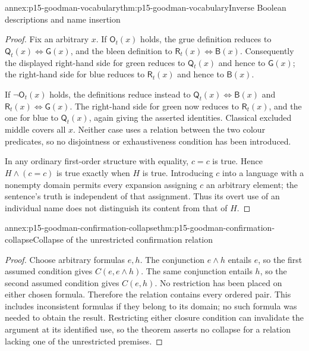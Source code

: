 \begin{annexitem}{annex:p15-goodman-vocabulary}{thm:p15-goodman-vocabulary}{Inverse Boolean descriptions and name insertion}
\begin{proof}
Fix an arbitrary $x$. If $\mathsf{O}_t(x)$ holds, the grue definition
reduces to $\mathsf{Q}_t(x)\Longleftrightarrow\mathsf{G}(x)$,
and the bleen definition to
$\mathsf{R}_t(x)\Longleftrightarrow\mathsf{B}(x)$.
Consequently the displayed right-hand side for green reduces to
$\mathsf{Q}_t(x)$ and hence to $\mathsf{G}(x)$; the right-hand
side for blue reduces to $\mathsf{R}_t(x)$ and hence to
$\mathsf{B}(x)$.

If $\neg\mathsf{O}_t(x)$ holds, the definitions reduce instead to
$\mathsf{Q}_t(x)\Longleftrightarrow\mathsf{B}(x)$ and
$\mathsf{R}_t(x)\Longleftrightarrow\mathsf{G}(x)$.
The right-hand side for green now reduces to $\mathsf{R}_t(x)$,
and the one for blue to $\mathsf{Q}_t(x)$, again giving the asserted
identities. Classical excluded middle covers all $x$. Neither case
uses a relation between the two colour predicates, so no disjointness
or exhaustiveness condition has been introduced.

In any ordinary first-order structure with equality, $c=c$ is true.
Hence $H\land(c=c)$ is true exactly when $H$ is true. Introducing
$c$ into a language with a nonempty domain permits every expansion
assigning $c$ an arbitrary element; the sentence's truth is independent
of that assignment. Thus its overt use of an individual name does not
distinguish its content from that of $H$.
\end{proof}
\end{annexitem}

\begin{annexitem}{annex:p15-goodman-confirmation-collapse}{thm:p15-goodman-confirmation-collapse}{Collapse of the unrestricted confirmation relation}
\begin{proof}
Choose arbitrary formulas $e,h$. The conjunction $e\land h$ entails
$e$, so the first assumed condition gives $C(e,e\land h)$.
The same conjunction entails $h$, so the second assumed condition
gives $C(e,h)$. No restriction has been placed on either chosen
formula. Therefore the relation contains every ordered pair.
This includes inconsistent formulas if they belong to its domain;
no such formula was needed to obtain the result. Restricting either
closure condition can invalidate the argument at its identified use,
so the theorem asserts no collapse for a relation lacking one of
the unrestricted premises.
\end{proof}
\end{annexitem}
